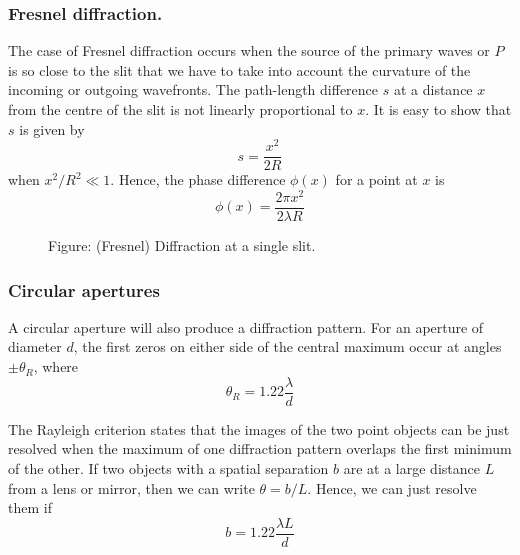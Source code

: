 \documentclass[../../../main.tex]{subfiles}
\begin{document}
\subsubsection{Fresnel diffraction.} The case of Fresnel diffraction occurs when the source of the primary waves or $P$ is so close to the slit that we have to take into account the curvature of the incoming or outgoing wavefronts. The path-length difference $s$ at a distance $x$ from the centre of the slit is not linearly proportional to $x$. It is easy to show that $s$ is given by
\begin{equation*}
    s=\frac{x^2}{2R}
\end{equation*}
when $x^2/R^2 \ll 1$. Hence, the phase difference $\phi(x)$ for a point at $x$ is
\begin{equation*}
    \phi(x)=\frac{2\pi x^2}{2\lambda R}
\end{equation*}

\begin{figure}
    \centering
    \caption*{Figure: (Fresnel) Diffraction at a single slit.}
\end{figure}

\subsubsection{Circular apertures}
A circular aperture will also produce a diffraction pattern. For an aperture of diameter $d$, the ﬁrst zeros on either side of the central maximum occur at angles $\pm \theta_R$, where
\begin{equation*}
    \theta_R=1.22\frac{\lambda}{d}
\end{equation*}

The Rayleigh criterion states that the images of the two point objects can be just resolved when the maximum of one diffraction pattern overlaps the ﬁrst minimum of the other. If two objects with a spatial separation $b$ are at a large distance $L$ from a lens or mirror, then we can write $\theta = b/L.$ Hence, we can just resolve them if
\begin{equation*}
    b=1.22\frac{\lambda L}{d}
\end{equation*}
\end{document}
